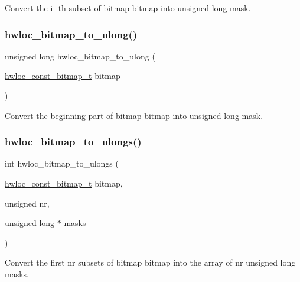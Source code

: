 Convert the {\ttfamily i} -\/th subset of bitmap {\ttfamily bitmap} into unsigned long mask. 

\mbox{\label{a00205_gab6a6bae22a33ec6adfc169a953c13e6c}} 
\subsubsection{\texorpdfstring{hwloc\+\_\+bitmap\+\_\+to\+\_\+ulong()}{hwloc\_bitmap\_to\_ulong()}}
{\footnotesize\ttfamily unsigned long hwloc\+\_\+bitmap\+\_\+to\+\_\+ulong (\begin{DoxyParamCaption}\item[{\hyperlink{a00205_gae991a108af01d408be2776c5b2c467b2}{hwloc\+\_\+const\+\_\+bitmap\+\_\+t}}]{bitmap }\end{DoxyParamCaption})}



Convert the beginning part of bitmap {\ttfamily bitmap} into unsigned long {\ttfamily mask}. 

\mbox{\label{a00205_gacd215a2348732de25d94a4ecd76d528c}} 
\subsubsection{\texorpdfstring{hwloc\+\_\+bitmap\+\_\+to\+\_\+ulongs()}{hwloc\_bitmap\_to\_ulongs()}}
{\footnotesize\ttfamily int hwloc\+\_\+bitmap\+\_\+to\+\_\+ulongs (\begin{DoxyParamCaption}\item[{\hyperlink{a00205_gae991a108af01d408be2776c5b2c467b2}{hwloc\+\_\+const\+\_\+bitmap\+\_\+t}}]{bitmap,  }\item[{unsigned}]{nr,  }\item[{unsigned long $\ast$}]{masks }\end{DoxyParamCaption})}



Convert the first {\ttfamily nr} subsets of bitmap {\ttfamily bitmap} into the array of {\ttfamily nr} unsigned long {\ttfamily masks}. 

